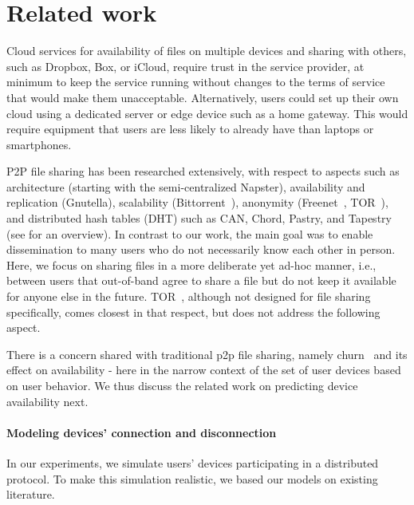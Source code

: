 \section{Related work}%
\label{RelatedWork}



Cloud services for availability of files on multiple devices and sharing with others, such as Dropbox, Box, or iCloud, require trust in the service provider, at minimum to keep the service running without changes to the terms of service that would make them unacceptable. Alternatively, users could set up their own cloud using a dedicated server or edge device such as a home gateway. This would require equipment that users are less likely to already have than laptops or smartphones. 

P2P file sharing has been researched extensively, with respect to aspects such as architecture (starting with the semi-centralized Napster), availability and replication (Gnutella), scalability (Bittorrent~\cite{bittorrent}), anonymity (Freenet~\cite{freenet}, TOR~\cite{Tor}), and distributed hash tables (DHT) such as CAN, Chord, Pastry, and Tapestry (see \cite{dhtchurn} for an overview). In contrast to our work, the main goal was to enable dissemination to many users who do not necessarily know each other in person. Here, we focus on sharing files in a more deliberate yet ad-hoc manner, i.e., between users that out-of-band agree to share a file but do not keep it available for anyone else in the future. TOR~\cite{Tor}, although not designed for file sharing specifically, comes closest in that respect, but does not address the following aspect.

There is a concern shared with traditional p2p file sharing, namely churn~\cite{dhtchurn} and its effect on availability - here in the narrow context of the set of user devices based on user behavior. We thus discuss the related work on predicting device availability next.

\paragraph*{Modeling devices' connection and disconnection} 

In our experiments, we simulate users' devices participating in a distributed protocol.
To make this simulation realistic, we based our models on existing literature. 

